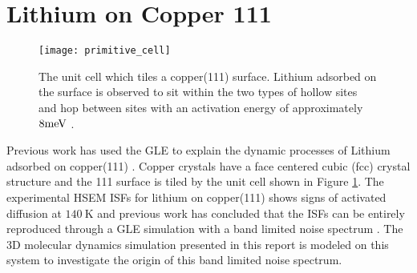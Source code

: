 \pagebreak

\section{Lithium on Copper 111}

\begin{figure}
	\centering
	\texttt{[image: primitive\_cell]}
	\caption{The unit cell which tiles a copper(111) surface. Lithium adsorbed on the surface is observed to sit within the two types of hollow sites and hop between sites with an activation energy of approximately $8\mev$ \cite{Ward}.}
	\label{fig:fcc_111_unit_cell}
\end{figure}

Previous work has used the GLE to explain the dynamic processes of Lithium adsorbed on copper(111) \cite{Ward}. Copper crystals have a face centered cubic (fcc) crystal structure and the 111 surface is tiled by the unit cell shown in Figure \ref{fig:fcc_111_unit_cell}. The experimental HSEM ISFs for lithium on copper(111) shows signs of activated diffusion at $\SI{140}{\kelvin}$ and previous work has concluded that the ISFs can be entirely reproduced through a GLE simulation with a band limited noise spectrum \cite{Ward}. The 3D molecular dynamics simulation presented in this report is modeled on this system to investigate the origin of this band limited noise spectrum. 
